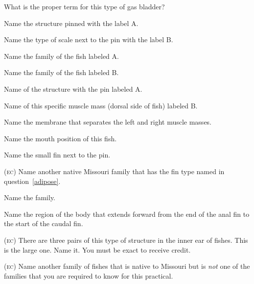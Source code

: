 \documentclass{exam}
\begin{document}
\begin{questions}
{%
\question What is the proper term for this type of gas bladder?
\vspace{2\baselineskip}

\question Name the structure pinned with the label A.

\question Name the type of scale next to the pin with the label B.
\vspace{2\baselineskip}

\question Name the family of the fish labeled A.

\question Name the family of the fish labeled B.
\vspace{2\baselineskip}

\question Name of the structure with the pin labeled A.

\question Name of this specific muscle mass (dorsal side of fish) labeled B.

\question Name the membrane that separates the left and right muscle masses.
\vspace{2\baselineskip}

\question Name the mouth position of this fish.


\question \label{adipose} Name the small fin next to the pin.

\bonusquestion \textsc{(ec)} Name another native Missouri family that has the fin type named in question~\ref{adipose}.
\vspace{2\baselineskip}

\newpage

\question Name the family.

\question Name the region of the body that extends forward from the end of the anal fin to the start of the caudal fin.
\vspace{2\baselineskip}

\bonusquestion \textsc{(ec)} There are three pairs of this type of structure in the inner ear of fishes.  This is the large one.  Name it. You must be exact to receive credit.

\bonusquestion \textsc{(ec)} Name another family of fishes that is native to Missouri but is \textit{not} one of the families that you are required to know for this practical. %
\vspace{2\baselineskip}

} %

\end{questions}





\end{document}
